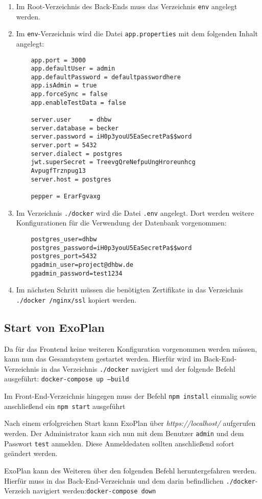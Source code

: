 \begin{enumerate}
	\item Im Root-Verzeichnis des Back-Ends muss das Verzeichnis \texttt{env} angelegt werden.
	\item Im \texttt{env}-Verzeichnis wird die Datei \texttt{app.properties} mit dem folgenden Inhalt angelegt:
	\begin{lstlisting}
	app.port = 3000
	app.defaultUser = admin
	app.defaultPassword = defaultpasswordhere
	app.isAdmin = true
	app.forceSync = false
	app.enableTestData = false
	
	server.user     = dhbw
	server.database = becker
	server.password = iH0p3youU5EaSecretPa$$word
	server.port = 5432
	server.dialect = postgres
	jwt.superSecret = TreevgQreNefpuUngHroreunhcg
	AvpugfTrznpug13
	server.host = postgres
	
	pepper = ErarFgvaxg
	\end{lstlisting}
	
	\item Im Verzeichnis \texttt{./docker} wird die Datei \texttt{.env} angelegt. Dort werden weitere Konfigurationen für die Verwendung der Datenbank vorgenommen:
	
	\begin{lstlisting}
	postgres_user=dhbw
	postgres_password=iH0p3youU5EaSecretPa$$word
	postgres_port=5432
	pgadmin_user=project@dhbw.de
	pgadmin_password=test1234
	\end{lstlisting}
	
	\item Im nächsten Schritt müssen die benötigten Zertifikate in das Verzeichnis \texttt{./docker
		/nginx/ssl} kopiert werden.
	
\end{enumerate}

\subsection{Start von ExoPlan}

Da für das Frontend keine weiteren Konfiguration vorgenommen werden müssen, kann nun das Gesamtsystem gestartet werden. 
Hierfür wird im Back-End-Verzeichnis in das Verzeichnis \texttt{./docker} navigiert und der folgende Befehl ausgeführt: \texttt{docker-compose up --build}

Im Front-End-Verzeichnis hingegen muss der Befehl \texttt{npm install} einmalig sowie anschließend ein \texttt{npm start} ausgeführt

Nach einem erfolgreichen Start kann ExoPlan über \textit{https://localhost/} aufgerufen werden. Der Administrator kann sich nun mit dem Benutzer \texttt{admin} und dem Passwort \texttt{test} anmelden. Diese Anmeldedaten sollten anschließend sofort geändert werden.

ExoPlan kann des Weiteren über den folgenden Befehl heruntergefahren werden. 
Hierfür muss in das Back-End-Verzeichnis und dem darin befindlichen \texttt{./docker}-Verzeich navigiert werden:\texttt{docker-compose down}